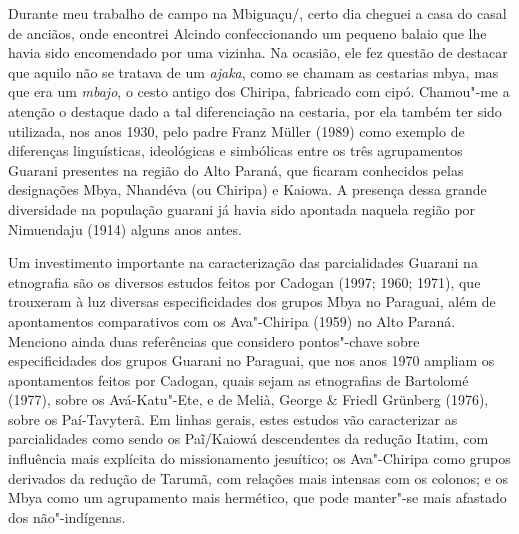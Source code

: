  


Durante meu trabalho de campo na  Mbiguaçu/, certo dia cheguei a
casa do casal de anciãos, onde encontrei Alcindo confeccionando um
pequeno balaio que lhe havia sido encomendado por uma vizinha. Na
ocasião, ele fez questão de destacar que aquilo não se tratava de um
\emph{ajaka}, como se chamam as cestarias mbya, mas que era um \emph{mbajo}, o cesto
antigo dos Chiripa, fabricado com cipó. Chamou"-me a atenção o destaque
dado a tal diferenciação na cestaria, por ela também ter sido
utilizada, nos anos 1930, pelo padre Franz Müller (1989) como exemplo
de diferenças linguísticas, ideológicas e simbólicas entre os três
agrupamentos Guarani presentes na região do Alto Paraná, que ficaram
conhecidos pelas designações Mbya, Nhandéva (ou Chiripa) e Kaiowa. A
presença dessa grande diversidade na população guarani já havia sido
apontada naquela região por Nimuendaju (1914) alguns anos antes.

Um investimento importante na caracterização das parcialidades Guarani
na etnografia são os diversos estudos feitos por Cadogan (1997;
1960; 1971), que trouxeram à luz diversas
especificidades dos grupos Mbya no Paraguai, além de apontamentos
comparativos com os Ava"-Chiripa (1959) no Alto Paraná. Menciono ainda
duas referências que considero pontos"-chave sobre
especificidades dos grupos Guarani no Paraguai, que nos anos 1970
ampliam os apontamentos feitos por Cadogan, quais sejam as etnografias
de Bartolomé (1977), sobre os Avá-Katu"-Ete, e de Melià,
George \& Friedl Grünberg (1976), sobre os Paí-Tavyterã. Em linhas
gerais, estes estudos vão caracterizar as parcialidades como sendo os
Paĩ/Kaiowá descendentes da redução
Itatim, com influência mais explícita do missionamento jesuítico; os
Ava"-Chiripa como grupos derivados da redução de Tarumã, com relações
mais intensas com os colonos; e os Mbya como um agrupamento mais
hermético, que pode manter"-se mais afastado dos não"-indígenas. 

